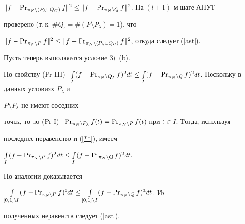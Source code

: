 \begin{pf}
$\|f-\PR_{\pi_N\setminus(P_{\lambda}\cup Q_C)} f\|^2


\leq\|f-\PR_{\pi_N\setminus Q}f\|^2$. На $(l+1)$-м шаге АПУТ


проверено (т.\,к. $\#Q_c=\#(P\setminus P_{\lambda})=1 $), что


$\|f-\PR_{\pi_N\setminus P} f\|^2 \leq \|f-\PR_{\pi_N\setminus


(P_{\lambda}\cup Q_C)}f\|^2$, откуда следует (\ref{ast}).





Пусть теперь выполняeтся условиe 3)~(b).


По свойству (Pr-III) \ $\int\limits_{I}(f-\PR_{\pi_N\setminus


Q_{\lambda}} f)^2dt \leq \int\limits_{I}(f-\PR_{\pi_N\setminus


Q}f)^2dt$. Поскольку в данных условиях $P_{\lambda}$ и


$P\setminus P_{\lambda}$ не имеют соседних


точек, то по \mbox{(Pr-I)} \ $\PR_{\pi_N\setminus


P_{\lambda}}f(t)=\PR_{\pi_N\setminus P}f(t)$ при $t\in I$. Tогда, используя


последнее неравенство и (\ref{**}), имеем


$\int\limits_{I}(f-\PR_{\pi_N\setminus P} f)^2dt \leq


\int\limits_{I}(f-\PR_{\pi_N\setminus Q}f)^2dt$.


По аналогии доказывается


$\int\limits_{[0,1]\setminus I}(f-\PR_{\pi_N\setminus P} f)^2dt \leq


\int\limits_{[0,1]\setminus I}(f-\PR_{\pi_N\setminus Q}f)^2dt$. Из


полученных неравенств следует (\ref{ast}).


\end{pf}





